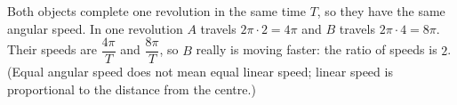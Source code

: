 Both objects complete one revolution in the same time $T$, so they have the same angular speed. In one revolution $A$ travels $2\pi\cdot2=4\pi$ and $B$ travels $2\pi\cdot4=8\pi$. Their speeds are $\dfrac{4\pi}{T}$ and $\dfrac{8\pi}{T}$, so $B$ really is moving faster: the ratio of speeds is $\boxed{2}$. (Equal angular speed does not mean equal linear speed; linear speed is proportional to the distance from the centre.)
